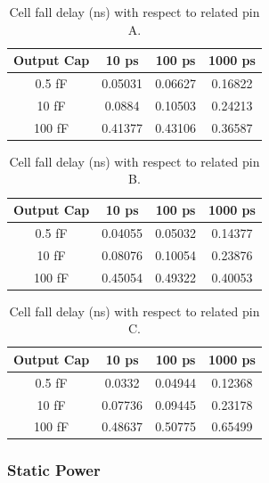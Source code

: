\documentclass[12pt]{article}
\begin{document}
\begin{table}[H]
	\centering
	\begin{tabular}{|c|c|c|c|}
		\hline
		Output Cap & 10 ps   & 100 ps  & 1000 ps \\
		\hline
		0.5 fF     & 0.05031 & 0.06627 & 0.16822 \\
		10 fF      & 0.0884  & 0.10503 & 0.24213 \\
		100 fF     & 0.41377 & 0.43106 & 0.36587 \\
		\hline
	\end{tabular}
	\caption{Cell fall delay (ns) with respect to related pin A.}
	\label{tab:fall_delay_A}
\end{table}

\begin{table}[H]
	\centering
	\begin{tabular}{|c|c|c|c|}
		\hline
		Output Cap & 10 ps   & 100 ps  & 1000 ps \\
		\hline
		0.5 fF     & 0.04055 & 0.05032 & 0.14377 \\
		10 fF      & 0.08076 & 0.10054 & 0.23876 \\
		100 fF     & 0.45054 & 0.49322 & 0.40053 \\
		\hline
	\end{tabular}
	\caption{Cell fall delay (ns) with respect to related pin B.}
	\label{tab:fall_delay_B}
\end{table}

\begin{table}[H]
	\centering
	\begin{tabular}{|c|c|c|c|}
		\hline
		Output Cap & 10 ps   & 100 ps  & 1000 ps \\
		\hline
		0.5 fF     & 0.0332  & 0.04944 & 0.12368 \\
		10 fF      & 0.07736 & 0.09445 & 0.23178 \\
		100 fF     & 0.48637 & 0.50775 & 0.65499 \\
		\hline
	\end{tabular}
	\caption{Cell fall delay (ns) with respect to related pin C.}
	\label{tab:fall_delay_C}
\end{table}

\subsubsection{Static Power}
\end{document}
